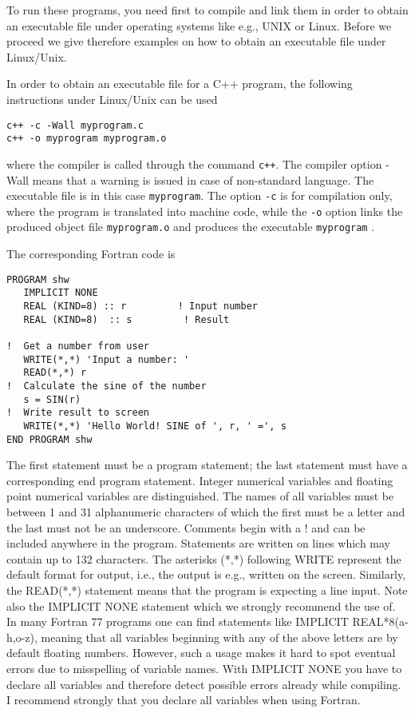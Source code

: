 To run these programs, you need first to compile and link
them in order to obtain an executable file under operating systems like  e.g., 
UNIX or Linux. 
Before we proceed we give therefore examples on how to obtain an
executable file under Linux/Unix. 

In order to obtain an executable file for a C++ program, the following 
instructions under Linux/Unix can be used
\begin{svgraybox}
\begin{verbatim}
c++ -c -Wall myprogram.c
c++ -o myprogram myprogram.o
\end{verbatim}
\end{svgraybox}
where the compiler is called through the command \verb$c++$. The compiler
option -Wall means that a warning is issued in case of non-standard
language. The executable file is in this case \verb$myprogram$. The option
\verb$-c$ is for compilation only, where the program is translated into machine code,
while the \verb$-o$ option links the produced object file \verb$myprogram.o$ 
and produces the executable \verb$myprogram$ .

The corresponding Fortran  code is 
\lstset{language=[90]Fortran}
\begin{lstlisting}[title={\href{{https://github.com/CompPhysics/CompPhysBook1/tree/master/doc/Programs/Chapter2/fortran/program1.f90}}{Click here to view code}}]
PROGRAM shw
   IMPLICIT NONE
   REAL (KIND=8) :: r         ! Input number
   REAL (KIND=8)  :: s         ! Result

!  Get a number from user
   WRITE(*,*) 'Input a number: '
   READ(*,*) r
!  Calculate the sine of the number
   s = SIN(r)
!  Write result to screen
   WRITE(*,*) 'Hello World! SINE of ', r, ' =', s
END PROGRAM shw
\end{lstlisting}
 The first statement must be a program statement; the last statement must have a
corresponding end program statement. 
Integer numerical variables and floating point numerical variables are distinguished. The
names of all variables must be between 1 and 31 alphanumeric characters of which the first
must be a letter and the last must not be an underscore. 
Comments begin with a ! and can be included anywhere in the program. 
Statements are written on lines which may contain up to 132 characters. 
The asterisks (*,*) following WRITE represent 
the default format for output, i.e., the output is e.g., 
written on the screen. Similarly, the READ(*,*) statement means
that the program is expecting a line input.
Note also the IMPLICIT NONE statement which we 
strongly recommend the use of. In many Fortran 77 programs one can  find
statements like IMPLICIT REAL*8(a-h,o-z), meaning
that all variables beginning with any of the above 
letters are by default floating numbers. However,
such a usage makes it hard to spot eventual errors
due to misspelling of variable names. With IMPLICIT NONE
you have to declare all variables and therefore detect
possible errors already while compiling. I recommend strongly that you declare all variables
when using Fortran.

